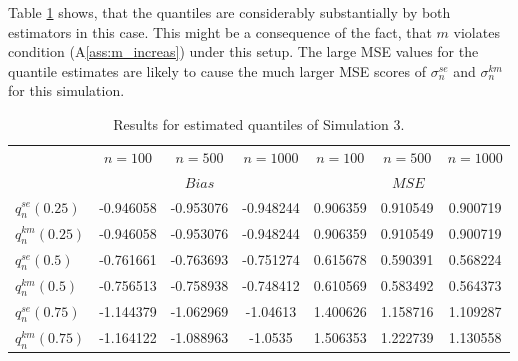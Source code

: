 %
\clearpage
Table \ref{tab:res_exppar2} shows, that the quantiles are considerably substantially by both estimators in this case. This might be a consequence of the fact, that $m$ violates condition (A\ref{ass:m_increas}) under this setup. The large MSE values for the quantile estimates are likely to cause the much larger MSE scores of $\sigma_n^{se}$ and $\sigma_n^{km}$ for this simulation.
\begin{table}[h!]
	\begin{center}
		
		\begin{tabular}{| l || c | c | c || c | c | c |}
			\hline
			&       $n=100$   &    $n=500$    &    $n=1000$ &       $n=100$   &    $n=500$    &    $n=1000$\\
			\cline{2-7}
			& \multicolumn{3}{c||}{$Bias$} &\multicolumn{3}{c|}{$MSE$}\\
			\hline
			\hline
			$q^{se}_n(0.25)$ & -0.946058 & -0.953076 & -0.948244& 0.906359 & 0.910549 & 0.900719\\
			$q^{km}_n(0.25)$ & -0.946058 & -0.953076 & -0.948244& 0.906359 & 0.910549 & 0.900719\\
			\hline
			$q^{se}_n(0.5)$ & -0.761661 & -0.763693 & -0.751274& 0.615678 & 0.590391 & 0.568224\\
			$q^{km}_n(0.5)$ & -0.756513 & -0.758938 & -0.748412 & 0.610569 & 0.583492 & 0.564373\\
			\hline
			$q^{se}_n(0.75)$ & -1.144379 & -1.062969 & -1.04613 & 1.400626 & 1.158716 & 1.109287\\
			$q^{km}_n(0.75)$ & -1.164122 & -1.088963 & -1.0535 & 1.506353 & 1.222739 & 1.130558\\
			\hline
		\end{tabular}
	\end{center}
	\caption{Results for estimated quantiles of Simulation 3.}
	\label{tab:res_exppar2}
\end{table}
